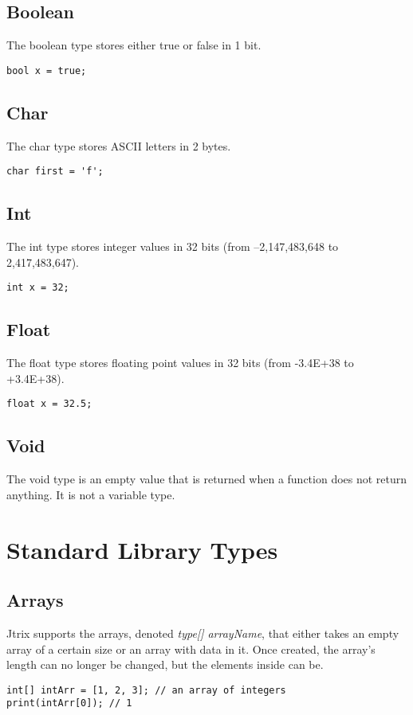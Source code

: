 \documentclass[titlepage, 12pt]{report}
\begin{document}
\subsection{Boolean}
The boolean type stores either true or false in 1 bit.
\begin{lstlisting}
bool x = true;
\end{lstlisting}
\subsection{Char}
The char type stores ASCII letters in 2 bytes.
\begin{lstlisting}
char first = 'f';
\end{lstlisting}
\subsection{Int}
The int type stores integer values in 32 bits (from --2,147,483,648 to 2,417,483,647).
\begin{lstlisting}
int x = 32;
\end{lstlisting}
\subsection{Float}
The float type stores floating point values in 32 bits (from -3.4E+38 to +3.4E+38).
\begin{lstlisting}
float x = 32.5;
\end{lstlisting}
\subsection{Void}
The void type is an empty value that is returned when a function does not return anything. It is not a variable type.

\section{Standard Library Types}
\subsection{Arrays}
Jtrix supports the arrays, denoted \textit{type[] arrayName}, that either takes an empty array of a certain size or an array with data in it. Once created, the array's length can no longer be changed, but the elements inside can be.
\begin{lstlisting}
int[] intArr = [1, 2, 3]; // an array of integers
print(intArr[0]); // 1
\end{lstlisting}
\end{document}
